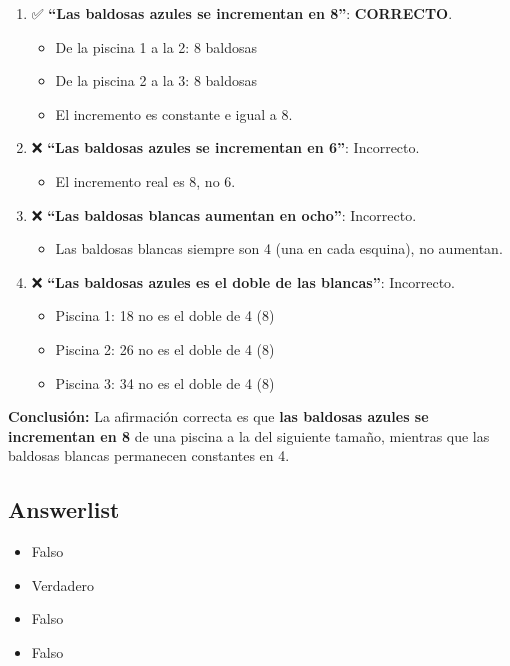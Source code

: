 \documentclass[
]{article}
\providecommand{\tightlist}{%
  \setlength{\itemsep}{0pt}\setlength{\parskip}{0pt}}
\begin{document}
\begin{enumerate}
\def\labelenumi{\arabic{enumi}.}
\tightlist
\item
  ✅ \textbf{``Las baldosas azules se incrementan en 8''}:
  \textbf{CORRECTO}.

  \begin{itemize}
  \tightlist
  \item
    De la piscina 1 a la 2: 8 baldosas
  \item
    De la piscina 2 a la 3: 8 baldosas
  \item
    El incremento es constante e igual a 8.
  \end{itemize}
\item
  ❌ \textbf{``Las baldosas azules se incrementan en 6''}: Incorrecto.

  \begin{itemize}
  \tightlist
  \item
    El incremento real es 8, no 6.
  \end{itemize}
\item
  ❌ \textbf{``Las baldosas blancas aumentan en ocho''}: Incorrecto.

  \begin{itemize}
  \tightlist
  \item
    Las baldosas blancas siempre son 4 (una en cada esquina), no
    aumentan.
  \end{itemize}
\item
  ❌ \textbf{``Las baldosas azules es el doble de las blancas''}:
  Incorrecto.

  \begin{itemize}
  \tightlist
  \item
    Piscina 1: 18 no es el doble de 4 (8)
  \item
    Piscina 2: 26 no es el doble de 4 (8)
  \item
    Piscina 3: 34 no es el doble de 4 (8)
  \end{itemize}
\end{enumerate}

\textbf{Conclusión:} La afirmación correcta es que \textbf{las baldosas
azules se incrementan en 8} de una piscina a la del siguiente tamaño,
mientras que las baldosas blancas permanecen constantes en 4.

\subsection{Answerlist}\label{answerlist-1}

\begin{itemize}
\tightlist
\item
  Falso
\item
  Verdadero
\item
  Falso
\item
  Falso
\end{itemize}
\end{document}
